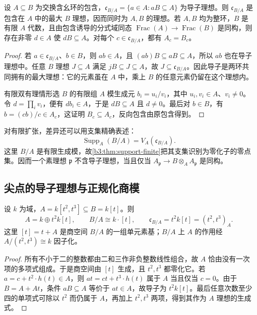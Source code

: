 \begin{proposition}\label{b3:prop:conductor-basic}
	设 \(A\subseteq B\) 为交换含幺环的包含，\(\mathfrak c_{B/A}=\{a\in A:aB\subseteq A\}\) 为导子理想。则 \(\mathfrak c_{B/A}\) 是包含在 \(A\) 中的最大 \(B\) 理想，因而同时为 \(A,B\) 的理想。若 \(A,B\) 均为整环，\(B\) 是有限 \(A\) 代数，且由包含诱导的分式域同态 \(\operatorname{Frac}(A)\to\operatorname{Frac}(B)\) 是同构，则存在非零 \(d\in A\) 使 \(dB\subseteq A\)。对每个 \(c\in\mathfrak c_{B/A}\)，都有 \(A_c=B_c\)。
\end{proposition}
\begin{proof}
	若 \(a\in\mathfrak c_{B/A}\)、\(b\in B\)，则 \(ab\in A\)，且 \((ab)B\subseteq aB\subseteq A\)，所以 \(ab\) 也在导子理想中。任意 \(B\) 理想 \(J\subseteq A\) 满足 \(jB\subseteq J\subseteq A\)，故 \(J\subseteq\mathfrak c_{B/A}\)。因此导子是两环共同拥有的最大理想：它的元素虽在 \(A\) 中，乘上 \(B\) 的任意元素仍留在这个理想内。

	有限双有理情形选 \(B\) 的有限组 \(A\) 模生成元 \(b_i=u_i/v_i\)，其中 \(u_i,v_i\in A\)、\(v_i\ne0\)。令 \(d=\prod_i v_i\)，便有 \(db_i\in A\)，于是 \(dB\subseteq A\) 且 \(d\ne0\)。最后对 \(b\in B\)，有 \(b=(cb)/c\in A_c\)，这证明 \(B_c\subseteq A_c\)，反向包含由原包含得到。
\end{proof}

对有限扩张，差异还可以用支集精确表述：
\[
	\operatorname{Supp}_A(B/A)=V_A(\mathfrak c_{B/A}).
\]
这里 \(B/A\) 是有限生成模，故\cref{b3:thm:support-finite}把其支集识别为零化子的零点集。因而一个素理想 \(\mathfrak p\) 不含导子理想，当且仅当 \(A_{\mathfrak p}\to B\otimes_AA_{\mathfrak p}\) 是同构。

\subsection{尖点的导子理想与正规化商模}\label{b3:subsec:0606:02}

\begin{proposition}\label{b3:prop:cusp-conductor}
	设 \(k\) 为域，\(A=k[t^2,t^3]\subseteq B=k[t]\)。则
	\[
		A=k\oplus t^2k[t],\qquad B/A\cong k\cdot[t],\qquad \mathfrak c_{B/A}=t^2k[t]=(t^2,t^3)_A.
	\]
	这里 \([t]=t+A\) 是商空间 \(B/A\) 的一组单元素基；\(B/A\) 上 \(A\) 的作用经 \(A/(t^2,t^3)\cong k\) 因子化。
\end{proposition}
\begin{proof}
	所有不小于二的整数都由二和三作非负整数线性组合，故 \(A\) 恰由没有一次项的多项式组成。于是商空间由 \([t]\) 生成，且 \(t^2,t^3\) 都零化它。若 \(a=c+t^2\cdot h(t)\in A\)，则 \(at=ct+t^3\cdot h(t)\) 属于 \(A\) 当且仅当 \(c=0\)。由于 \(B=A+At\)，条件 \(aB\subseteq A\) 等价于 \(at\in A\)，故导子为 \(t^2k[t]\)。最后任意次数至少四的单项式可除以 \(t^2\) 而仍属于 \(A\)，再加上 \(t^2,t^3\) 两项，得到其作为 \(A\) 理想的生成式。
\end{proof}

